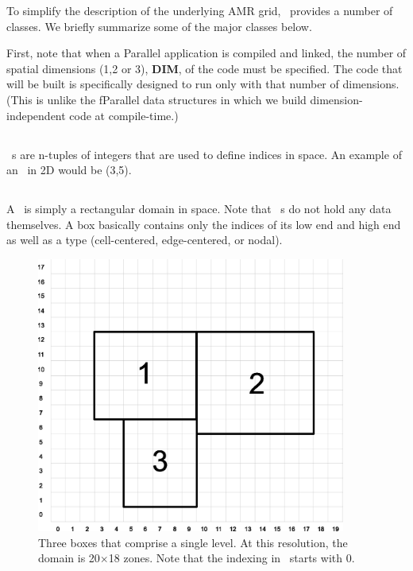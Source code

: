 To simplify the description of the underlying AMR grid, \BoxLib\
provides a number of classes.  We briefly summarize some of the major
classes below.

First, note that when a Parallel application is compiled and linked,
the number of spatial dimensions (1,2 or 3), {\bf DIM},
 of the code must be specified.  The code that will be
built is specifically designed to run only with that number of dimensions.
(This is unlike the fParallel data structures in which we build
dimension-independent code at compile-time.)

\subsection{\IntVect}

\IntVect~s are n-tuples of integers that are used to define
indices in space.  An example of an \IntVect\ in 2D would
be (3,5).

\subsection{\BoxType}

A \BoxType\ is simply a rectangular domain in space.  Note that \BoxType~s
do not hold any data themselves. A box basically contains
only the indices of its low end and high end as well as a type 
(cell-centered, edge-centered, or nodal).

\begin{figure}[h]
\centering
\includegraphics[width=4.0in]{./BoxLib/index_grid2}
\caption{\label{fig:boxes} Three boxes that comprise a single level.
At this resolution, the domain is 20$\times$18 zones.  Note that the
indexing in \BoxLib\ starts with $0$.}
\end{figure}

